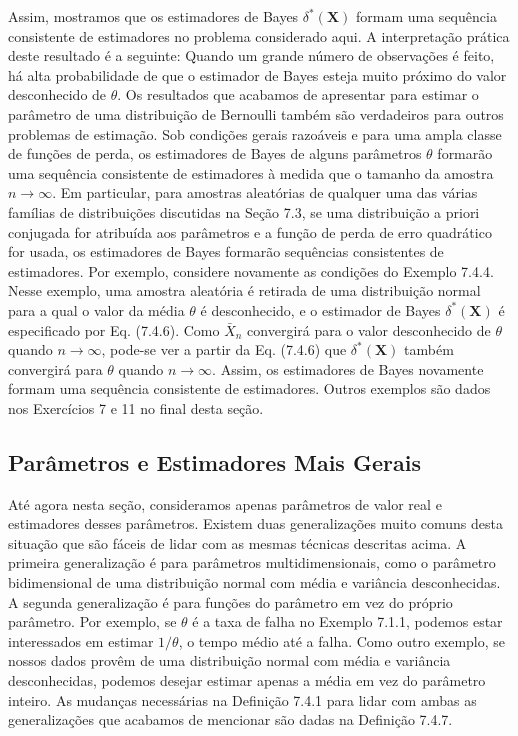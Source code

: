 \vspace{1cm}
Assim, mostramos que os estimadores de Bayes $\delta^*(\mathbf{X})$ formam uma sequência consistente de estimadores no problema considerado aqui. A interpretação prática deste resultado é a seguinte: Quando um grande número de observações é feito, há alta probabilidade de que o estimador de Bayes esteja muito próximo do valor desconhecido de $\theta$.
Os resultados que acabamos de apresentar para estimar o parâmetro de uma distribuição de Bernoulli também são verdadeiros para outros problemas de estimação. Sob condições gerais razoáveis e para uma ampla classe de funções de perda, os estimadores de Bayes de alguns parâmetros $\theta$ formarão uma sequência consistente de estimadores à medida que o tamanho da amostra $n \to \infty$. Em particular, para amostras aleatórias de qualquer uma das várias famílias de distribuições discutidas na Seção 7.3, se uma distribuição a priori conjugada for atribuída aos parâmetros e a função de perda de erro quadrático for usada, os estimadores de Bayes formarão sequências consistentes de estimadores.
Por exemplo, considere novamente as condições do Exemplo 7.4.4. Nesse exemplo, uma amostra aleatória é retirada de uma distribuição normal para a qual o valor da média $\theta$ é desconhecido, e o estimador de Bayes $\delta^*(\mathbf{X})$ é especificado por Eq. (7.4.6). Como $\bar{X}_n$ convergirá para o valor desconhecido de $\theta$ quando $n \to \infty$, pode-se ver a partir da Eq. (7.4.6) que $\delta^*(\mathbf{X})$ também convergirá para $\theta$ quando $n \to \infty$. Assim, os estimadores de Bayes novamente formam uma sequência consistente de estimadores. Outros exemplos são dados nos Exercícios 7 e 11 no final desta seção.

\subsection*{Parâmetros e Estimadores Mais Gerais}
Até agora nesta seção, consideramos apenas parâmetros de valor real e estimadores desses parâmetros. Existem duas generalizações muito comuns desta situação que são fáceis de lidar com as mesmas técnicas descritas acima. A primeira generalização é para parâmetros multidimensionais, como o parâmetro bidimensional de uma distribuição normal com média e variância desconhecidas. A segunda generalização é para funções do parâmetro em vez do próprio parâmetro. Por exemplo, se $\theta$ é a taxa de falha no Exemplo 7.1.1, podemos estar interessados em estimar $1/\theta$, o tempo médio até a falha. Como outro exemplo, se nossos dados provêm de uma distribuição normal com média e variância desconhecidas, podemos desejar estimar apenas a média em vez do parâmetro inteiro.
As mudanças necessárias na Definição 7.4.1 para lidar com ambas as generalizações que acabamos de mencionar são dadas na Definição 7.4.7.

